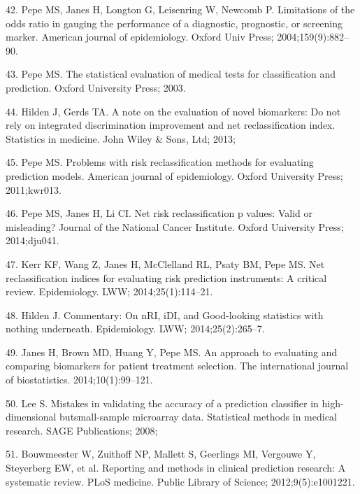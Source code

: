 \documentclass[11pt]{article}
\begin{document}
42. Pepe MS, Janes H, Longton G, Leisenring W, Newcomb P. Limitations of
the odds ratio in gauging the performance of a diagnostic, prognostic,
or screening marker. American journal of epidemiology. Oxford Univ
Press; 2004;159(9):882--90.

43. Pepe MS. The statistical evaluation of medical tests for
classification and prediction. Oxford University Press; 2003.

44. Hilden J, Gerds TA. A note on the evaluation of novel biomarkers: Do
not rely on integrated discrimination improvement and net
reclassification index. Statistics in medicine. John Wiley \& Sons, Ltd;
2013;

45. Pepe MS. Problems with risk reclassification methods for evaluating
prediction models. American journal of epidemiology. Oxford University
Press; 2011;kwr013.

46. Pepe MS, Janes H, Li CI. Net risk reclassification p values: Valid
or misleading? Journal of the National Cancer Institute. Oxford
University Press; 2014;dju041.

47. Kerr KF, Wang Z, Janes H, McClelland RL, Psaty BM, Pepe MS. Net
reclassification indices for evaluating risk prediction instruments: A
critical review. Epidemiology. LWW; 2014;25(1):114--21.

48. Hilden J. Commentary: On nRI, iDI, and Good-looking statistics
with nothing underneath. Epidemiology. LWW; 2014;25(2):265--7.

49. Janes H, Brown MD, Huang Y, Pepe MS. An approach to evaluating and
comparing biomarkers for patient treatment selection. The international
journal of biostatistics. 2014;10(1):99--121.

50. Lee S. Mistakes in validating the accuracy of a prediction
classifier in high-dimensional butsmall-sample microarray data.
Statistical methods in medical research. SAGE Publications; 2008;

51. Bouwmeester W, Zuithoff NP, Mallett S, Geerlings MI, Vergouwe Y,
Steyerberg EW, et al. Reporting and methods in clinical prediction
research: A systematic review. PLoS medicine. Public Library of Science;
2012;9(5):e1001221.
\end{document}
